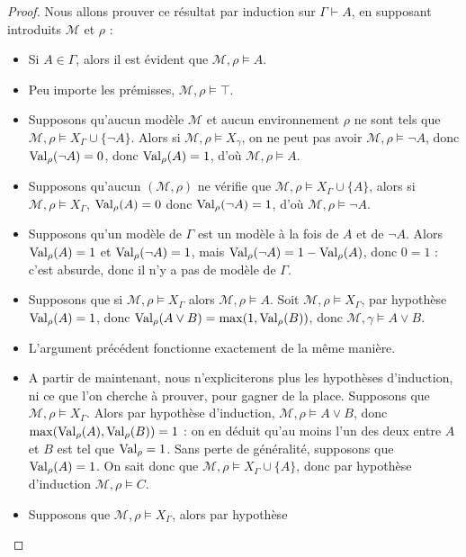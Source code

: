 \begin{proof}
  Nous allons prouver ce résultat par induction sur $\Gamma\vdash A$, en
  supposant introduits $\mathcal M$ et $\rho$ :
  \begin{itemize}
  \item Si $A\in \Gamma$, alors il est évident que $\mathcal M,\rho\models A$.
  \item Peu importe les prémisses, $\mathcal M,\rho\models \top$.
  \item Supposons qu'aucun modèle $\mathcal M$ et aucun environnement $\rho$ ne
    sont tels que $\mathcal M,\rho\models X_\Gamma\cup\{\lnot A\}$. Alors si
    $\mathcal M,\rho\models X_\gamma$, on ne peut pas avoir
    $\mathcal M,\rho\models \lnot A$, donc $\operatorname{Val}_\rho(\lnot A) = 0$, donc
    $\operatorname{Val}_\rho(A) = 1$, d'où $\mathcal M,\rho\models A$.
  \item Supposons qu'aucun $(\mathcal M,\rho)$ ne vérifie que
    $\mathcal M,\rho\models X_\Gamma\cup\{A\}$, alors si
    $\mathcal M,\rho\models X_\Gamma$, $\operatorname{Val}_\rho(A) = 0$ donc
    $\operatorname{Val}_\rho(\lnot A) = 1$, d'où $\mathcal M,\rho\models \lnot A$.
  \item Supposons qu'un modèle de $\Gamma$ est un modèle à la fois de $A$ et de
    $\lnot A$. Alors $\operatorname{Val}_\rho(A) = 1$ et $\operatorname{Val}_\rho(\lnot A) = 1$, mais
    $\operatorname{Val}_\rho(\lnot A) = 1 - \operatorname{Val}_\rho(A)$, donc $0 = 1$ : c'est absurde, donc
    il n'y a pas de modèle de $\Gamma$.
  \item Supposons que si $\mathcal M,\rho\models X_\Gamma$ alors
    $\mathcal M,\rho\models A$. Soit $\mathcal M,\rho\models X_\Gamma$, par
    hypothèse $\operatorname{Val}_\rho(A) = 1$, donc $\operatorname{Val}_\rho(A\lor B) = \max(1,\operatorname{Val}_\rho(B))$,
    donc $\mathcal M,\gamma\models A\lor B$.
  \item L'argument précédent fonctionne exactement de la même manière.
  \item A partir de maintenant, nous n'expliciterons plus les hypothèses
    d'induction, ni ce que l'on cherche à prouver, pour gagner de la place.
    Supposons que $\mathcal M,\rho\models X_\Gamma$. Alors par hypothèse
    d'induction, $\mathcal M,\rho\models A\lor B$, donc
    $\max(\operatorname{Val}_\rho(A),\operatorname{Val}_\rho(B)) = 1$ : on en déduit qu'au moins l'un des deux
    entre $A$ et $B$ est tel que $\operatorname{Val}_\rho = 1$. Sans perte de généralité,
    supposons que $\operatorname{Val}_\rho(A) = 1$. On sait donc que
    $\mathcal M,\rho\models X_\Gamma\cup\{A\}$, donc par hypothèse d'induction
    $\mathcal M,\rho\models C$.
  \item Supposons que $\mathcal M,\rho\models X_\Gamma$, alors par hypothèse

\end{itemize}
\end{proof}
